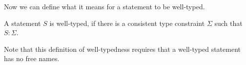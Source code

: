 Now we can define what it means for a statement to be well-typed. 

\begin{definition}
A statement $S$ is
well-typed, if there is a consistent type constraint $\Sigma$ such that $S: \Sigma$.
\end{definition}

Note that this definition
of well-typedness requires that a well-typed statement has no free 
names.






